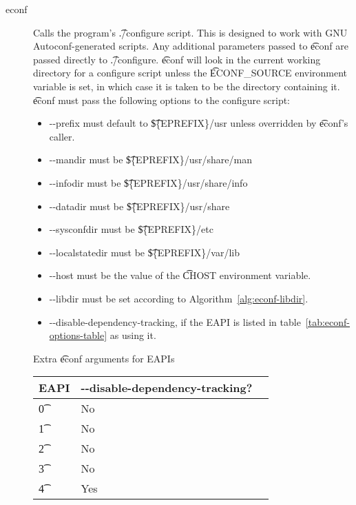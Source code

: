 \begin{description}
\item[econf] Calls the program's \t{./configure} script. This is designed to work with GNU
    Autoconf-generated scripts. Any additional parameters passed to \t{econf} are passed directly
    to \t{./configure}. \t{econf} will look in the current working directory for a configure script
    unless the \t{ECONF\_SOURCE} environment variable is set, in which case it is taken to be the
    directory containing it. \t{econf} must pass the following options to the configure script:

    \begin{itemize}
    \item -{}-prefix must default to \t{\$\{EPREFIX\}/usr} unless overridden by \t{econf}'s caller.
    \item -{}-mandir must be \t{\$\{EPREFIX\}/usr/share/man}
    \item -{}-infodir must be \t{\$\{EPREFIX\}/usr/share/info}
    \item -{}-datadir must be \t{\$\{EPREFIX\}/usr/share}
    \item -{}-sysconfdir must be \t{\$\{EPREFIX\}/etc}
    \item -{}-localstatedir must be \t{\$\{EPREFIX\}/var/lib}
    \item -{}-host must be the value of the \t{CHOST} environment variable.
    \item -{}-libdir must be set according to Algorithm~\ref{alg:econf-libdir}.
    \item -{}-disable-dependency-tracking, if the EAPI is listed in
        table~\ref{tab:econf-options-table} as using it.
    \end{itemize}

    \begin{centertable}{Extra \t{econf} arguments for EAPIs} \label{tab:econf-options-table}
        \begin{tabular}{ l l l }
            \toprule
                \multicolumn{1}{c}{\textbf{EAPI}} &
                \multicolumn{1}{c}{\textbf{-{}-disable-dependency-tracking}?} \\
                \midrule
        \t{0} & No \\
        \t{1} & No \\
        \t{2} & No \\
        \t{3} & No \\
        \t{4} & Yes \\
        \bottomrule
        \end{tabular}
    \end{centertable}


\end{description}
